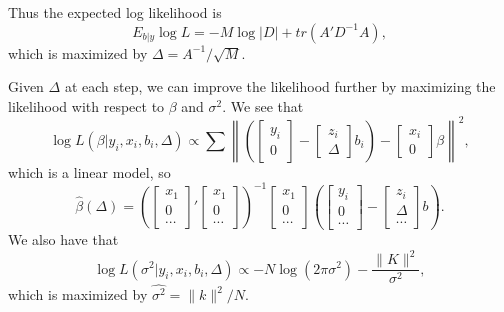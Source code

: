 \documentclass[12pt,twoside]{article}
\begin{document}
Thus the expected log likelihood is \[
   E_{b|y} \log L = - M \log |D| + tr(A'D^{-1}A),
\] which is maximized by \(\Delta = A^{-1} / \sqrt{M}\).

Given \(\Delta\) at each step, we can improve the likelihood further by maximizing the likelihood with respect to \(\beta\) and \(\sigma^2\).  We see that \[
  \log L(\beta | y_i, x_i, b_i, \Delta) \propto \sum \left\lVert \left( \begin{bmatrix} y_i \\ 0\end{bmatrix} - \begin{bmatrix} z_i \\ \Delta\end{bmatrix} b_i \right) - \begin{bmatrix} x_i \\ 0 \end{bmatrix} \beta \right\rVert^2,
\] which is a linear model, so \[
  \widehat{\beta}(\Delta) = \left(\begin{bmatrix}x_1 \\ 0 \\ \cdots\end{bmatrix}'\begin{bmatrix}x_1 \\ 0 \\ \cdots \end{bmatrix}\right)^{-1}\begin{bmatrix}x_1 \\ 0 \\ \cdots \end{bmatrix}\left(\begin{bmatrix} y_i \\ 0 \\ \cdots \end{bmatrix} - \begin{bmatrix} z_i \\ \Delta \\ \cdots \end{bmatrix}b \right).
\] We also have that \[
  \log L(\sigma^2 | y_i, x_i, b_i, \Delta) \propto -N\log(2\pi \sigma^2) - \frac{\lVert K \rVert^2}{\sigma^2},
\] which is maximized by \(\widehat{\sigma^2} = \rVert k \lVert^2 / N\).
\end{document}
